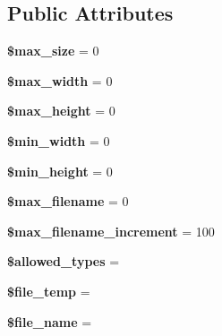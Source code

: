 \subsection*{Public Attributes}
\begin{DoxyCompactItemize}
\item 
\mbox{\label{class_c_i___upload_a27d0d0dbf05c1945cad098842aa7eec8}} 
{\bfseries \$max\+\_\+size} = 0
\item 
\mbox{\label{class_c_i___upload_a2834f46feb321a9dbe96ef9cba7ebfd0}} 
{\bfseries \$max\+\_\+width} = 0
\item 
\mbox{\label{class_c_i___upload_ae53a453590ee5781729ac09270bb6877}} 
{\bfseries \$max\+\_\+height} = 0
\item 
\mbox{\label{class_c_i___upload_a877e276589dab7f46afc257154e569fd}} 
{\bfseries \$min\+\_\+width} = 0
\item 
\mbox{\label{class_c_i___upload_abc00f467240a49e3d50c15d13e562b56}} 
{\bfseries \$min\+\_\+height} = 0
\item 
\mbox{\label{class_c_i___upload_aae25280ab45c6fb34a483ad2c83559ad}} 
{\bfseries \$max\+\_\+filename} = 0
\item 
\mbox{\label{class_c_i___upload_a4c690afef5e812a617babedc4d9b0a6e}} 
{\bfseries \$max\+\_\+filename\+\_\+increment} = 100
\item 
\mbox{\label{class_c_i___upload_afc2fc4c3438dc63870775b82f198b53f}} 
{\bfseries \$allowed\+\_\+types} = \textquotesingle{}\textquotesingle{}
\item 
\mbox{\label{class_c_i___upload_a026f3a9481c261bb22e0e6005f03c35b}} 
{\bfseries \$file\+\_\+temp} = \textquotesingle{}\textquotesingle{}
\item 
\mbox{\label{class_c_i___upload_a880691a6a72acb695c0d2e4efe688c3a}} 
{\bfseries \$file\+\_\+name} = \textquotesingle{}\textquotesingle{}
\item 
\mbox{\label{class_c_i___upload_a48f9d5b951f98238bf2325d683355d49}} 

\end{DoxyCompactItemize}
